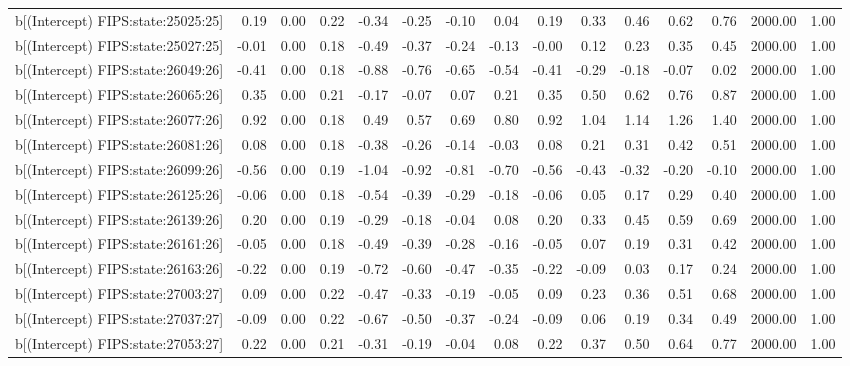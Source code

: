 \begin{table}[ht]
\begin{tabular}{rrrrrrrrrrrrrrr}
  b[(Intercept) FIPS:state:25025:25] & 0.19 & 0.00 & 0.22 & -0.34 & -0.25 & -0.10 & 0.04 & 0.19 & 0.33 & 0.46 & 0.62 & 0.76 & 2000.00 & 1.00 \\ 
  b[(Intercept) FIPS:state:25027:25] & -0.01 & 0.00 & 0.18 & -0.49 & -0.37 & -0.24 & -0.13 & -0.00 & 0.12 & 0.23 & 0.35 & 0.45 & 2000.00 & 1.00 \\ 
  b[(Intercept) FIPS:state:26049:26] & -0.41 & 0.00 & 0.18 & -0.88 & -0.76 & -0.65 & -0.54 & -0.41 & -0.29 & -0.18 & -0.07 & 0.02 & 2000.00 & 1.00 \\ 
  b[(Intercept) FIPS:state:26065:26] & 0.35 & 0.00 & 0.21 & -0.17 & -0.07 & 0.07 & 0.21 & 0.35 & 0.50 & 0.62 & 0.76 & 0.87 & 2000.00 & 1.00 \\ 
  b[(Intercept) FIPS:state:26077:26] & 0.92 & 0.00 & 0.18 & 0.49 & 0.57 & 0.69 & 0.80 & 0.92 & 1.04 & 1.14 & 1.26 & 1.40 & 2000.00 & 1.00 \\ 
  b[(Intercept) FIPS:state:26081:26] & 0.08 & 0.00 & 0.18 & -0.38 & -0.26 & -0.14 & -0.03 & 0.08 & 0.21 & 0.31 & 0.42 & 0.51 & 2000.00 & 1.00 \\ 
  b[(Intercept) FIPS:state:26099:26] & -0.56 & 0.00 & 0.19 & -1.04 & -0.92 & -0.81 & -0.70 & -0.56 & -0.43 & -0.32 & -0.20 & -0.10 & 2000.00 & 1.00 \\ 
  b[(Intercept) FIPS:state:26125:26] & -0.06 & 0.00 & 0.18 & -0.54 & -0.39 & -0.29 & -0.18 & -0.06 & 0.05 & 0.17 & 0.29 & 0.40 & 2000.00 & 1.00 \\ 
  b[(Intercept) FIPS:state:26139:26] & 0.20 & 0.00 & 0.19 & -0.29 & -0.18 & -0.04 & 0.08 & 0.20 & 0.33 & 0.45 & 0.59 & 0.69 & 2000.00 & 1.00 \\ 
  b[(Intercept) FIPS:state:26161:26] & -0.05 & 0.00 & 0.18 & -0.49 & -0.39 & -0.28 & -0.16 & -0.05 & 0.07 & 0.19 & 0.31 & 0.42 & 2000.00 & 1.00 \\ 
  b[(Intercept) FIPS:state:26163:26] & -0.22 & 0.00 & 0.19 & -0.72 & -0.60 & -0.47 & -0.35 & -0.22 & -0.09 & 0.03 & 0.17 & 0.24 & 2000.00 & 1.00 \\ 
  b[(Intercept) FIPS:state:27003:27] & 0.09 & 0.00 & 0.22 & -0.47 & -0.33 & -0.19 & -0.05 & 0.09 & 0.23 & 0.36 & 0.51 & 0.68 & 2000.00 & 1.00 \\ 
  b[(Intercept) FIPS:state:27037:27] & -0.09 & 0.00 & 0.22 & -0.67 & -0.50 & -0.37 & -0.24 & -0.09 & 0.06 & 0.19 & 0.34 & 0.49 & 2000.00 & 1.00 \\ 
  b[(Intercept) FIPS:state:27053:27] & 0.22 & 0.00 & 0.21 & -0.31 & -0.19 & -0.04 & 0.08 & 0.22 & 0.37 & 0.50 & 0.64 & 0.77 & 2000.00 & 1.00 \\ 

\end{tabular}
\end{table}
